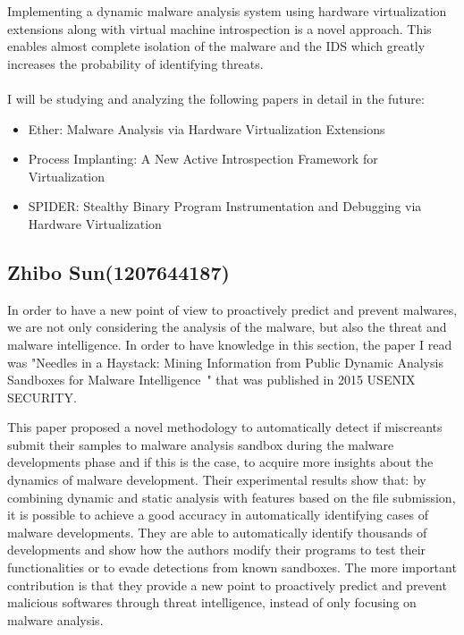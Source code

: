 \documentclass[16pt]{article}
\begin{document}
		Implementing a dynamic malware analysis system using hardware virtualization extensions along with virtual machine introspection is a novel approach. This enables almost complete isolation of the malware and the IDS which greatly increases the probability of identifying threats.\\ \\
		I will be studying and analyzing the following papers in detail in the future:
		\begin{itemize}
			\item Ether: Malware Analysis via Hardware Virtualization Extensions~\cite{dinaburg2008ether}
			\item Process Implanting: A New Active Introspection Framework for Virtualization~\cite{jiang2011procimplant}
			\item SPIDER: Stealthy Binary Program Instrumentation and Debugging via Hardware Virtualization~\cite{dongyan2013spider}
		\end{itemize}		
		
		\subsection{Zhibo Sun(1207644187)}
		In order to have a new point of view to proactively predict and prevent malwares, we are not only considering the analysis of the malware, but also the threat and malware intelligence. In order to have knowledge in this section, the paper I read was "Needles in a Haystack: Mining Information from Public Dynamic Analysis Sandboxes for Malware Intelligence~\cite{graziano2015needles}" that was published in 2015 USENIX SECURITY.
		
		This paper proposed a novel methodology to automatically detect if miscreants submit their samples to malware analysis sandbox during the malware developments phase and if this is the case, to acquire more insights about the dynamics of malware development. Their experimental results show that: by combining dynamic and static analysis with features based on the file submission, it is possible to achieve a good accuracy in automatically identifying cases of malware developments. They are able to automatically identify thousands of developments and show how the authors modify their programs to test their functionalities or to evade detections from known sandboxes. The more important contribution is that they provide a new point to proactively predict and prevent malicious softwares through threat intelligence, instead of only focusing on malware analysis.
		
\end{document}
